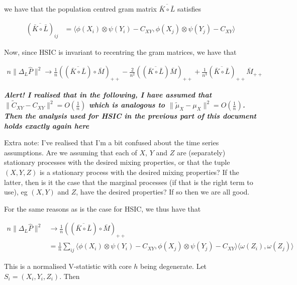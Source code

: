 \documentclass{article}
\begin{document}
we have that the population centred gram matrix $\overline{\bar{K}\circ\bar{L}}$ satisfies

\begin{align*}
(\overline{\bar{K}\circ\bar{L}})_{ij} &= 
\langle\phi(X_i)\otimes \psi(Y_i) - C_{XY}, \phi(X_j)\otimes\psi(Y_j)  - C_{XY}\rangle
\end{align*}

Now, since HSIC is invariant to recentring the gram matrices, we have that

\begin{align*}
n\|\Delta_L \hat{P}\|^2 \longrightarrow \frac{1}{n}((\overline{\bar{K}\circ \bar{L}}) \circ \bar{M})_{++} - \frac{2}{n^2}((\overline{\bar{K}\circ \bar{L}})\bar{M})_{++} + \frac{1}{n^3}(\overline{\bar{K}\circ \bar{L}})_{++}\bar{M}_{++}
\end{align*}

\begin{center}
\emph{\textbf{Alert! I realised that in the following, I have assumed that $\|\tilde{C}_{XY} - C_{XY}\|^2 = O(\frac{1}{n})$ which is analogous to $\|\tilde{\mu}_{X} - \mu_{X}\|^2 = O(\frac{1}{n})$. Then the analysis used for HSIC in the previous part of this document holds exactly again here}}
\end{center}

\begin{center}
Extra note: I've realised that I'm a bit confused about the time series assumptions. Are we assuming that each of $X$, $Y$ and $Z$ are (separately) stationary processes with the desired mixing properties, or that the tuple $(X,Y,Z)$ is a stationary process with the desired mixing properties? If the latter, then is it the case that the marginal processes (if that is the right term to use), eg $(X,Y)$ and $Z$, have the desired properties? If so then we are all good.
\end{center}


For the same reasons as is the case for HSIC, we thus have that

\begin{align*}
n\|\Delta_L \hat{P}\|^2 &\longrightarrow \frac{1}{n}((\overline{\bar{K}\circ \bar{L}}) \circ \bar{M})_{++}\\&=
\frac{1}{n} \sum_{ij} \langle\phi(X_i)\otimes \psi(Y_i) - C_{XY}, \phi(X_j)\otimes \psi(Y_j) - C_{XY}\rangle \langle \omega(Z_i),\omega(Z_j) \rangle
\end{align*}

This is a normalised V-statistic with core $h$ being degenerate. Let $S_i = (X_i,Y_i,Z_i)$. Then
\end{document}
